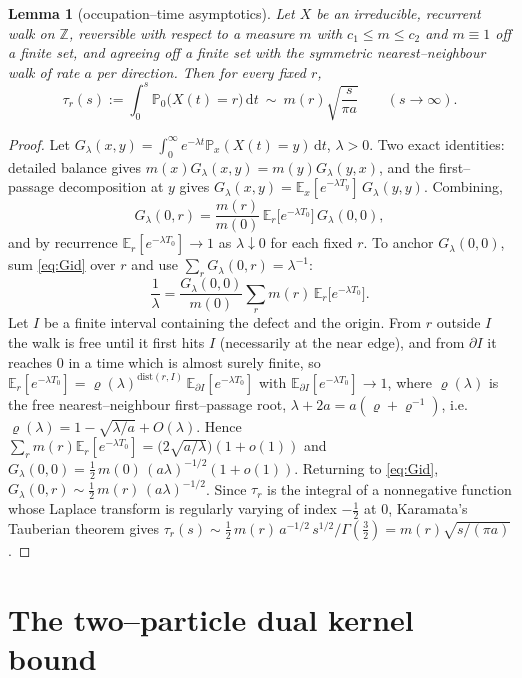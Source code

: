 \documentclass[11pt]{article}
\theoremstyle{plain}
\newtheorem{lemma}[theorem]{Lemma}
\theoremstyle{definition}
\theoremstyle{remark}
\newcommand{\Z}{\mathbb{Z}}\newcommand{\R}{\mathbb{R}}\newcommand{\N}{\mathbb{N}}
\newcommand{\E}{\mathbb{E}}\newcommand{\PP}{\mathbb{P}}\newcommand{\dd}{\,\mathrm{d}}
\begin{document}
\begin{lemma}[occupation--time asymptotics]\label{lem:tau}
Let $X$ be an irreducible, recurrent walk on $\Z$, reversible with respect to a
measure $m$ with $c_1\le m\le c_2$ and $m\equiv1$ off a finite set, and agreeing off a
finite set with the symmetric nearest--neighbour walk of rate $a$ per direction. Then
for every fixed $r$,
\[
  \tau_r(s):=\int_0^s\PP_0\big(X(t)=r\big)\dd t\ \sim\ m(r)\sqrt{\frac{s}{\pi a}}
  \qquad(s\to\infty).
\]
\end{lemma}
\begin{proof}
Let $G_\lambda(x,y)=\int_0^\infty e^{-\lambda t}\PP_x(X(t)=y)\dd t$, $\lambda>0$. Two
exact identities: detailed balance gives $m(x)G_\lambda(x,y)=m(y)G_\lambda(y,x)$, and
the first--passage decomposition at $y$ gives
$G_\lambda(x,y)=\E_x[e^{-\lambda T_y}]\,G_\lambda(y,y)$. Combining,
\begin{equation}\label{eq:Gid}
  G_\lambda(0,r)=\frac{m(r)}{m(0)}\,\E_r\big[e^{-\lambda T_0}\big]\,G_\lambda(0,0),
\end{equation}
and by recurrence $\E_r[e^{-\lambda T_0}]\to1$ as $\lambda\downarrow0$ for each fixed
$r$. To anchor $G_\lambda(0,0)$, sum \eqref{eq:Gid} over $r$ and use
$\sum_rG_\lambda(0,r)=\lambda^{-1}$:
\[
  \frac1\lambda=\frac{G_\lambda(0,0)}{m(0)}\sum_r m(r)\,\E_r\big[e^{-\lambda T_0}\big].
\]
Let $I$ be a finite interval containing the defect and the origin. From $r$ outside
$I$ the walk is free until it first hits $I$ (necessarily at the near edge), and from
$\partial I$ it reaches $0$ in a time which is almost surely finite, so
$\E_r[e^{-\lambda T_0}]=\varrho(\lambda)^{\mathrm{dist}(r,I)}\,
\E_{\partial I}[e^{-\lambda T_0}]$ with $\E_{\partial I}[e^{-\lambda T_0}]\to1$, where
$\varrho(\lambda)$ is the free nearest--neighbour first--passage root,
$\lambda+2a=a(\varrho+\varrho^{-1})$, i.e.\
$\varrho(\lambda)=1-\sqrt{\lambda/a}+O(\lambda)$. Hence
$\sum_rm(r)\E_r[e^{-\lambda T_0}]=\big(2\sqrt{a/\lambda}\big)(1+o(1))$ and
$G_\lambda(0,0)=\tfrac12\,m(0)\,(a\lambda)^{-1/2}(1+o(1))$. Returning to
\eqref{eq:Gid}, $G_\lambda(0,r)\sim\tfrac12\,m(r)\,(a\lambda)^{-1/2}$. Since
$\tau_r$ is the integral of a nonnegative function whose Laplace transform is
regularly varying of index $-\tfrac12$ at $0$, Karamata's Tauberian theorem gives
$\tau_r(s)\sim\tfrac12\,m(r)\,a^{-1/2}\,s^{1/2}/\Gamma(\tfrac32)
=m(r)\sqrt{s/(\pi a)}$.
\end{proof}

\section{The two--particle dual kernel bound}\label{sec:kernel}
\end{document}
